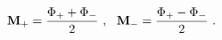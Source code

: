 \begin{equation}
{\bf M}_+ =  {{\Phi_+ + \Phi_-}\over {2}} \ , \ \ {\bf M}_- =
{{\Phi_+ - \Phi_-}\over {2}} \label{M+M-} \ .
\end{equation}

